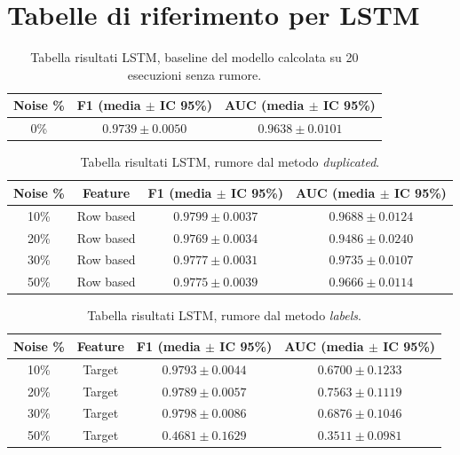 \documentclass[../main.tex]{subfiles}
\begin{document}
\section{Tabelle di riferimento per LSTM}
\begin{table}[H]
\centering\small
{}
\begin{tabular}{ccc}
\toprule
\textbf{Noise \%} & \textbf{F1 (media $\pm$ IC 95\%)} & \textbf{AUC (media $\pm$ IC 95\%)} \\
\midrule
0\%  & $0.9739 \pm 0.0050$ & $0.9638 \pm 0.0101$ \\
\bottomrule
\end{tabular}
\caption{Tabella risultati LSTM, baseline del modello calcolata su 20 esecuzioni senza rumore.}
\label{tab:lstm_baseline}
\end{table}
\begin{table}[H]
\centering\small
{}
\begin{tabular}{cccc}
\toprule
\textbf{Noise \%} & \textbf{Feature} & \textbf{F1 (media $\pm$ IC 95\%)} & \textbf{AUC (media $\pm$ IC 95\%)} \\
\midrule
10\% & Row based & $0.9799 \pm 0.0037$ & $0.9688 \pm 0.0124$ \\
20\% & Row based & $0.9769 \pm 0.0034$ & $0.9486 \pm 0.0240$ \\
30\% & Row based & $0.9777 \pm 0.0031$ & $0.9735 \pm 0.0107$ \\
50\% & Row based & $0.9775 \pm 0.0039$ & $0.9666 \pm 0.0114$ \\
\bottomrule
\end{tabular}
\caption{Tabella risultati LSTM, rumore dal metodo \textit{duplicated}.}
\label{tab:lstm_duplicated}
\end{table}
\begin{table}[H]
\centering\small
{}
\begin{tabular}{cccc}
\toprule
\textbf{Noise \%} & \textbf{Feature} & \textbf{F1 (media $\pm$ IC 95\%)} & \textbf{AUC (media $\pm$ IC 95\%)} \\
\midrule
10\% & Target & $0.9793 \pm 0.0044$ & $0.6700 \pm 0.1233$ \\
20\% & Target & $0.9789 \pm 0.0057$ & $0.7563 \pm 0.1119$ \\
30\% & Target & $0.9798 \pm 0.0086$ & $0.6876 \pm 0.1046$ \\
50\% & Target & $\mathbf{0.4681 \pm 0.1629}$ & $\mathbf{0.3511 \pm 0.0981}$ \\
\bottomrule
\end{tabular}
\caption{Tabella risultati LSTM, rumore dal metodo \textit{labels}.}
\label{tab:lstm_labels}
\end{table}
\end{document}
